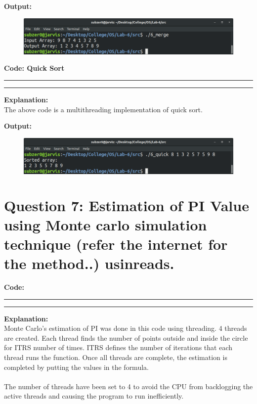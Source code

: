 \documentclass{article}
\begin{document}
\bigskip
\noindent
\textbf{\Large Output:}

\begin{figure}[h]
	\includegraphics[width=\textwidth]{output/6_merge.png}
\end{figure}
\bigskip

\par\noindent
\textbf{\Large Code: Quick Sort}
\smallskip
\par\noindent\rule{\textwidth}{0.4pt}

\par\noindent\rule{\textwidth}{0.4pt}

\bigskip
\noindent
\textbf{\Large Explanation: } \\

The above code is a multithreading implementation of quick sort. 

\bigskip
\noindent
\textbf{\Large Output:}

\begin{figure}[h]
	\includegraphics[width=\textwidth]{output/6_quick.png}
\end{figure}
\bigskip

\section*{Question 7: Estimation of PI Value using Monte carlo simulation technique (refer the internet for the
method..) usinreads.}
\bigskip
\bigskip

\par\noindent
\textbf{\Large Code: }
\smallskip
\par\noindent\rule{\textwidth}{0.4pt}

\par\noindent\rule{\textwidth}{0.4pt}

\bigskip
\noindent
\textbf{\Large Explanation: } \\

Monte Carlo's estimation of PI was done in this code using threading.
4 threads are created. Each thread finds the number of points outside
and inside the circle for ITRS number of times. ITRS defines the number
of iterations that each thread runs the function. Once all threads are
complete, the estimation is completed by putting the values in the
formula.
\\\\The number of threads have been set to 4 to avoid the CPU from 
backlogging the active threads and causing the program to run 
inefficiently.
\end{document}
